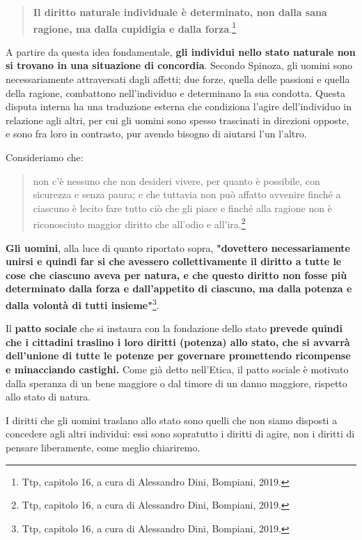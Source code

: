 \begin{quotation}
	\small 	\textbf{Il diritto naturale individuale è determinato, non dalla
	sana ragione, ma dalla cupidigia e dalla forza}.\footnote{Ttp, capitolo 16, a cura di Alessandro Dini, Bompiani, 2019.}
	
\end{quotation}

A partire da questa idea fondamentale, \textbf{gli individui nello stato naturale non
si trovano in una situazione di concordia}. Secondo Spinoza, gli uomini sono necessariamente attraversati dagli affetti; due forze, quella delle passioni e quella della ragione, combattono nell’individuo e determinano la sua condotta. Questa disputa
interna ha una traduzione esterna che condiziona l’agire dell’individuo in relazione agli altri, per cui gli uomini sono spesso trascinati in direzioni opposte, e sono fra loro
in contrasto, pur avendo bisogno di aiutarsi l’un l’altro.

Consideriamo che:
\begin{quotation}
	\small non c'è nessuno che non desideri vivere, per quanto è possibile, con sicurezza e senza paura; e che tuttavia non può affatto avvenire finché a ciascuno è lecito fare tutto ciò che gli piace e finché alla ragione non è riconosciuto maggior diritto che all'odio e all'ira.\footnote{Ttp, capitolo 16, a cura di Alessandro Dini, Bompiani, 2019.}
	
\end{quotation}

\textbf{Gli uomini}, alla luce di quanto riportato sopra, \textbf{"dovettero necessariamente unirsi e quindi far si che avessero collettivamente il diritto a tutte le cose che ciascuno aveva per natura, e che questo diritto non fosse più determinato dalla forza e dall'appetito di ciascuno, ma dalla potenza e dalla volontà di tutti insieme"}\footnote{Ttp, capitolo 16, a cura di Alessandro Dini, Bompiani, 2019.}.

Il \textbf{patto sociale} che si instaura con la fondazione dello stato \textbf{prevede quindi che i cittadini traslino i loro diritti (potenza) allo stato, che si avvarrà dell'unione di tutte le potenze per governare promettendo ricompense e minacciando castighi.}
Come già detto nell'Etica, il patto sociale è motivato dalla speranza di un bene maggiore  o dal timore di un danno maggiore, rispetto allo stato di natura. 

I diritti che gli uomini traslano allo stato sono quelli che non siamo disposti a concedere agli altri individui: essi sono sopratutto i diritti di agire, non i diritti di pensare liberamente, come meglio chiariremo.

